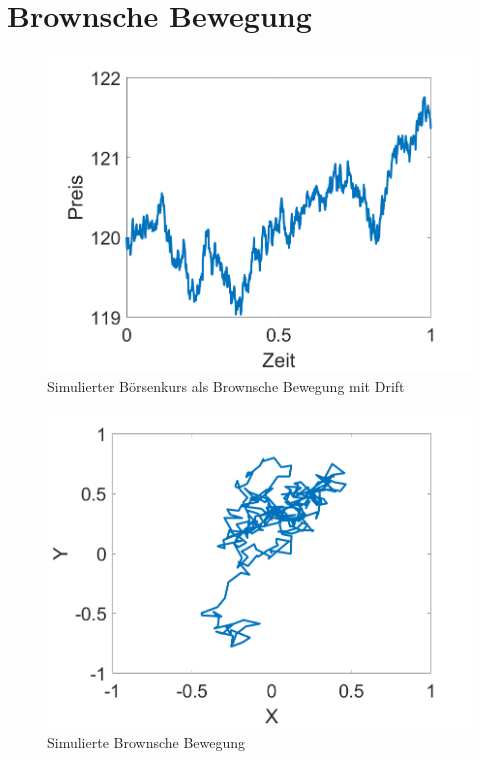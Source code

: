%
%
%
%

\section{Brownsche Bewegung\label{brown:BrownBewegung}}


\centering
\begin{minipage}{0.45\textwidth}
	\centering
	\begin{figure}[H]
	\includegraphics[width=\linewidth]{papers/brown/images/boersenKurs-simuliert.png}
	\caption{Simulierter Börsenkurs als Brownsche Bewegung mit Drift}
	\label{brown:1Dbrownian}
	\end{figure}
\end{minipage}
\hspace{0.05\linewidth}
\begin{minipage}{0.45\textwidth}
	\centering
	\begin{figure}[H]
	\includegraphics[width=\linewidth]{papers/brown/images/brownscheBewegung-simuliert.png}
	\caption{Simulierte Brownsche Bewegung}
	\label{brown:2Dbrownian}
\end{figure}
\end{minipage}


